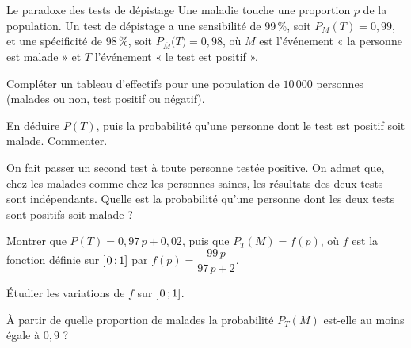 \begin{exercice}[3]{Le paradoxe des tests de dépistage}
Une maladie touche une proportion $p$ de la population. Un test de dépistage a une sensibilité de 99\,\%, soit $P_M(T)=0{,}99$,
et une spécificité de 98\,\%, soit $P_{\overline M}\big(\overline T\big)=0{,}98$, où $M$ est l'événement « la personne est malade » et
$T$ l'événement « le test est positif ».
\begin{questions}
  \item Compléter un tableau d'effectifs pour une population de $10\,000$ personnes (malades ou non, test positif ou négatif).
  \item En déduire $P(T)$, puis la probabilité qu'une personne dont le test est positif soit malade. Commenter.
  \item On fait passer un second test à toute personne testée positive. On admet que, chez les malades comme chez les personnes
    saines, les résultats des deux tests sont indépendants. Quelle est la probabilité qu'une personne dont les deux tests sont
    positifs soit malade ?
\end{questions}
\begin{questions}[resume]
  \item Montrer que $P(T)=0{,}97\,p+0{,}02$, puis que $P_T(M)=f(p)$, où $f$ est la fonction définie sur $\mathopen{]}0\,{;}\,1\mathclose{]}$ par
    $f(p)=\dfrac{99\,p}{97\,p+2}$.
  \item Étudier les variations de $f$ sur $\mathopen{]}0\,{;}\,1\mathclose{]}$.
  \item À partir de quelle proportion de malades la probabilité $P_T(M)$ est-elle au moins égale à $0{,}9$ ?
\end{questions}
\end{exercice}

